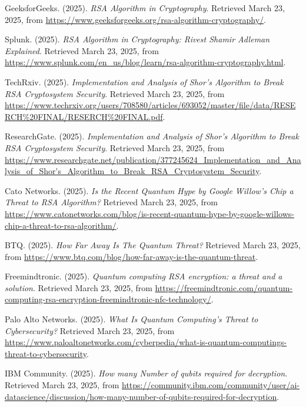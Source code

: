 \documentclass[12pt,a4paper]{report}
\begin{document}
\begin{thebibliography}{50}
    GeeksforGeeks. (2025).
    \textit{RSA Algorithm in Cryptography}.
    Retrieved March 23, 2025, from \url{https://www.geeksforgeeks.org/rsa-algorithm-cryptography/}.
    
    Splunk. (2025).
    \textit{RSA Algorithm in Cryptography: Rivest Shamir Adleman Explained}.
    Retrieved March 23, 2025, from \url{https://www.splunk.com/en_us/blog/learn/rsa-algorithm-cryptography.html}.
    
    TechRxiv. (2025).
    \textit{Implementation and Analysis of Shor's Algorithm to Break RSA Cryptosystem Security}.
    Retrieved March 23, 2025, from \url{https://www.techrxiv.org/users/708580/articles/693052/master/file/data/RESERCH%20FINAL/RESERCH%20FINAL.pdf}.
    
    ResearchGate. (2025).
    \textit{Implementation and Analysis of Shor's Algorithm to Break RSA Cryptosystem Security}.
    Retrieved March 23, 2025, from \url{https://www.researchgate.net/publication/377245624_Implementation_and_Analysis_of_Shor's_Algorithm_to_Break_RSA_Cryptosystem_Security}.
    
    Cato Networks. (2025).
    \textit{Is the Recent Quantum Hype by Google Willow's Chip a Threat to RSA Algorithm?}
    Retrieved March 23, 2025, from \url{https://www.catonetworks.com/blog/is-recent-quantum-hype-by-google-willows-chip-a-threat-to-rsa-algorithm/}.
    
    BTQ. (2025).
    \textit{How Far Away Is The Quantum Threat?}
    Retrieved March 23, 2025, from \url{https://www.btq.com/blog/how-far-away-is-the-quantum-threat}.
    
    Freemindtronic. (2025).
    \textit{Quantum computing RSA encryption: a threat and a solution}.
    Retrieved March 23, 2025, from \url{https://freemindtronic.com/quantum-computing-rsa-encryption-freemindtronic-nfc-technology/}.
    
    Palo Alto Networks. (2025).
    \textit{What Is Quantum Computing's Threat to Cybersecurity?}
    Retrieved March 23, 2025, from \url{https://www.paloaltonetworks.com/cyberpedia/what-is-quantum-computings-threat-to-cybersecurity}.
    
    IBM Community. (2025).
    \textit{How many Number of qubits required for decryption}.
    Retrieved March 23, 2025, from \url{https://community.ibm.com/community/user/ai-datascience/discussion/how-many-number-of-qubits-required-for-decryption}.
    

\end{thebibliography}
\end{document}
